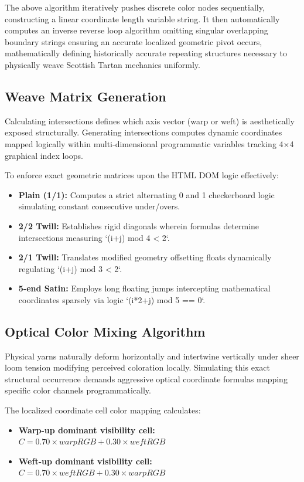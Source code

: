 The above algorithm iteratively pushes discrete color nodes sequentially, constructing a linear coordinate length variable string. It then automatically computes an inverse reverse loop algorithm omitting singular overlapping boundary strings ensuring an accurate localized geometric pivot occurs, mathematically defining historically accurate repeating structures necessary to physically weave Scottish Tartan mechanics uniformly.

\subsection{Weave Matrix Generation}
Calculating intersections defines which axis vector (warp or weft) is aesthetically exposed structurally. Generating intersections computes dynamic coordinates mapped logically within multi-dimensional programmatic variables tracking 4×4 graphical index loops.

To enforce exact geometric matrices upon the HTML DOM logic effectively:
\begin{itemize}
    \item \textbf{Plain (1/1):} Computes a strict alternating 0 and 1 checkerboard logic simulating constant consecutive under/overs.
    \item \textbf{2/2 Twill:} Establishes rigid diagonals wherein formulas determine intersections measuring `(i+j) mod 4 < 2`.
    \item \textbf{2/1 Twill:} Translates modified geometry offsetting floats dynamically regulating `(i+j) mod 3 < 2`.
    \item \textbf{5-end Satin:} Employs long floating jumps intercepting mathematical coordinates sparsely via logic `(i*2+j) mod 5 == 0`.
\end{itemize}

\subsection{Optical Color Mixing Algorithm}
Physical yarns naturally deform horizontally and intertwine vertically under sheer loom tension modifying perceived coloration locally. Simulating this exact structural occurrence demands aggressive optical coordinate formulas mapping specific color channels programmatically.

The localized coordinate cell color mapping calculates:
\begin{itemize}
    \item \textbf{Warp-up dominant visibility cell:} $C = 0.70 \times warpRGB + 0.30 \times weftRGB$
    \item \textbf{Weft-up dominant visibility cell:} $C = 0.70 \times weftRGB + 0.30 \times warpRGB$
\end{itemize}

